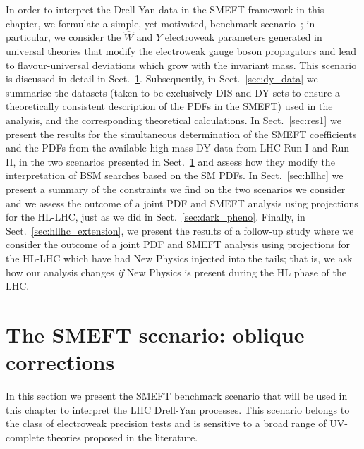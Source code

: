 \documentclass[withindex,glossary]{cam-thesis}
\begin{document}
In order to interpret the Drell-Yan data in the SMEFT framework in this chapter,
we formulate a simple, yet motivated, benchmark scenario~\cite{Farina:2016rws};
in particular, we consider the $\hat{W}$ and $\hat{Y}$ electroweak parameters generated in 
universal theories that modify the electroweak gauge boson propagators 
and lead to flavour-universal deviations which grow with the invariant mass. This scenario is discussed
in detail in Sect.~\ref{sec:dy_scenarios}. Subsequently, in Sect.~\ref{sec:dy_data} we summarise the datasets (taken to be
exclusively DIS and DY sets to ensure a theoretically consistent description of the PDFs
in the SMEFT) used in the 
analysis, and the corresponding theoretical calculations. In Sect.~\ref{sec:res1} we present the 
results for the simultaneous determination of the
SMEFT coefficients and the PDFs from the available high-mass DY data
from LHC Run I and Run II, in the two
scenarios presented in Sect.~\ref{sec:dy_scenarios} and assess how they
modify the interpretation of BSM searches based on the SM PDFs.
%
In Sect.~\ref{sec:hllhc} we present a summary of the constraints we find on the two
scenarios we consider and we assess the outcome of a joint
PDF and SMEFT analysis using projections for the HL-LHC, just as we did
in Sect.~\ref{sec:dark_pheno}.
% 
Finally, in Sect.~\ref{sec:hllhc_extension}, we present the results of a follow-up study
where we consider the outcome of a joint PDF and SMEFT analysis using projections for
the HL-LHC which have had New Physics injected into the tails; that is, we ask how our 
analysis changes \textit{if} New Physics is present during the HL phase of the LHC.

\section{The SMEFT scenario: oblique corrections}
\label{sec:dy_scenarios}

In this section we present the SMEFT benchmark scenario that will be
used in this chapter to interpret the LHC Drell-Yan processes. This 
scenario belongs to the class of electroweak precision tests and is
sensitive to a broad range of UV-complete theories proposed in the literature.
\end{document}
